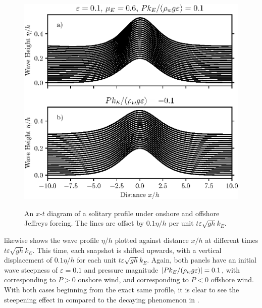 \documentclass{jfm}
\renewcommand*{\epsilon}{\varepsilon}
\begin{document}
\begin{figure}
  \centering
  { %
    \label{fig:xt_offset_solitary:a}
    \label{fig:xt_offset_solitary:b}
  }
  \includegraphics{XT-Offset.eps}
  \caption{
    An $x$-$t$ diagram of a solitary profile under
    onshore and
    offshore Jeffreys forcing.
    The lines are offset by $0.1 \eta/h$ per unit $t \epsilon \sqrt{g h}
    k_E$.
  }
  \label{fig:xt_offset_solitary}
\end{figure}

 likewise shows the wave profile $\eta/h$
plotted against distance $x/h$ at different times $t \epsilon \sqrt{g h}
k_E$.
This time, each snapshot is shifted upwards, with a vertical
displacement of $0.1 \eta/h$ for each unit $t\epsilon \sqrt{g h} k_E$.
Again, both panels have an initial wave steepness of $\epsilon = 0.1$
and pressure magnitude $\abs{P k_E/(\rho_w g \epsilon)} = 0.1$, with
 corresponding to $P>0$ onshore wind,
and  corresponding to $P<0$ offshore
wind.
With both cases beginning from the exact same profile, it is clear to
see the steepening effect in  compared
to the decaying phenomenon in .
\end{document}
